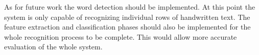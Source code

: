 \documentclass{article}
\begin{document}
\begin{multicols}{2}
          As for future work the word detection should be implemented. At this point the system is only capable of recognizing individual rows of handwritten text. The feature extraction and classification phases should also be implemented for the whole recognition process to be complete. This would allow more accurate evaluation of the whole system.

   \end{multicols}
\end{document}
